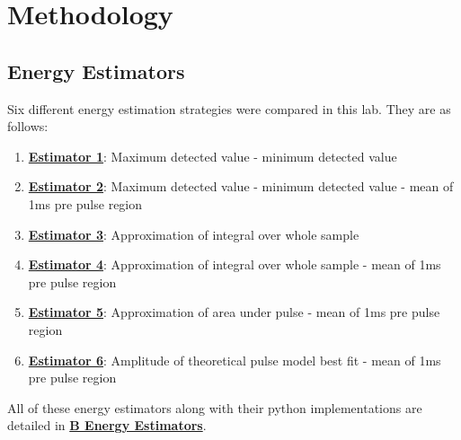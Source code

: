 \documentclass[
	letterpaper, %
	10pt, %
]{template}
\begin{document}
\section{Methodology}\label{sec::method}
\subsection{Energy Estimators}
Six different energy estimation strategies were compared in this lab. They are as follows:\\
\begin{enumerate}
	\item\textbf{\hyperref[est-1]{Estimator 1}}: Maximum detected value - minimum detected value
	\item\textbf{\hyperref[est-2]{Estimator 2}}: Maximum detected value - minimum detected value - mean of 1ms pre pulse region
	\item\textbf{\hyperref[est-3]{Estimator 3}}: Approximation of integral over whole sample
	\item\textbf{\hyperref[est-4]{Estimator 4}}: Approximation of integral over whole sample - mean of 1ms pre pulse region
	\item\textbf{\hyperref[est-5]{Estimator 5}}: Approximation of area under pulse - mean of 1ms pre pulse region
	\item\textbf{\hyperref[est-6]{Estimator 6}}: Amplitude of theoretical pulse model best fit - mean of 1ms pre pulse region\\
\end{enumerate}
All of these energy estimators along with their python implementations are detailed in \textbf{\hyperref[sec::estimators]{B Energy Estimators}}.
\end{document}
